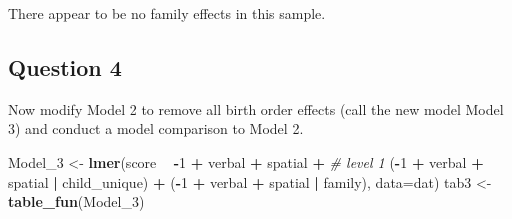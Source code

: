 \documentclass[]{article}
\newenvironment{Shaded}{\begin{snugshade}}{\end{snugshade}}
\newcommand{\KeywordTok}[1]{\textcolor[rgb]{0.13,0.29,0.53}{\textbf{#1}}}
\newcommand{\DataTypeTok}[1]{\textcolor[rgb]{0.13,0.29,0.53}{#1}}
\newcommand{\DecValTok}[1]{\textcolor[rgb]{0.00,0.00,0.81}{#1}}
\newcommand{\StringTok}[1]{\textcolor[rgb]{0.31,0.60,0.02}{#1}}
\newcommand{\CommentTok}[1]{\textcolor[rgb]{0.56,0.35,0.01}{\textit{#1}}}
\newcommand{\OperatorTok}[1]{\textcolor[rgb]{0.81,0.36,0.00}{\textbf{#1}}}
\newcommand{\NormalTok}[1]{#1}
\begin{document}
There appear to be no family effects in this sample.

\subsection{Question 4}\label{question-4}

Now modify Model 2 to remove all birth order effects (call the new model
Model 3) and conduct a model comparison to Model 2.

\begin{Shaded}
\begin{Highlighting}[]
\NormalTok{Model_}\DecValTok{3}\NormalTok{ <-}\StringTok{ }\KeywordTok{lmer}\NormalTok{(score }\OperatorTok{~}\StringTok{ }
\StringTok{                }\OperatorTok{-}\DecValTok{1} \OperatorTok{+}\StringTok{ }\NormalTok{verbal }\OperatorTok{+}\StringTok{ }\NormalTok{spatial }\OperatorTok{+}\StringTok{ }\CommentTok{# level 1}
\StringTok{                }\NormalTok{(}\OperatorTok{-}\DecValTok{1} \OperatorTok{+}\StringTok{ }\NormalTok{verbal }\OperatorTok{+}\StringTok{ }\NormalTok{spatial }\OperatorTok{|}\StringTok{ }\NormalTok{child_unique) }\OperatorTok{+}
\StringTok{                }\NormalTok{(}\OperatorTok{-}\DecValTok{1} \OperatorTok{+}\StringTok{ }\NormalTok{verbal }\OperatorTok{+}\StringTok{ }\NormalTok{spatial }\OperatorTok{|}\StringTok{ }\NormalTok{family),}
                \DataTypeTok{data=}\NormalTok{dat) }
\NormalTok{tab3    <-}\StringTok{ }\KeywordTok{table_fun}\NormalTok{(Model_}\DecValTok{3}\NormalTok{)}


\end{Highlighting}
\end{Shaded}
\end{document}
